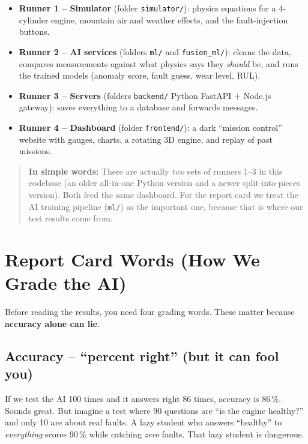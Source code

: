 \documentclass[11pt]{article}
\newenvironment{simplebox}
  {\par\medskip\noindent\begin{quote}\color{blue!55!black}\small
   \textbf{\textsf{In simple words:}}\space\space}
  {\end{quote}\medskip}
\newcommand{\code}[1]{\texttt{#1}}
\begin{document}
\begin{itemize}[nosep]
  \item \textbf{Runner 1 -- Simulator} (folder \code{simulator/}): physics
        equations for a 4-cylinder engine, mountain air and weather effects,
        and the fault-injection buttons.
  \item \textbf{Runner 2 -- AI services} (folders \code{ml/} and
        \code{fusion\_ml/}): cleans the data, compares measurements against
        what physics says they \emph{should} be, and runs the trained models
        (anomaly score, fault guess, wear level, RUL).
  \item \textbf{Runner 3 -- Servers} (folders \code{backend/} Python
        FastAPI + Node.js gateway): saves everything to a database and
        forwards messages.
  \item \textbf{Runner 4 -- Dashboard} (folder \code{frontend/}): a dark
        ``mission control'' website with gauges, charts, a rotating 3D
        engine, and replay of past missions.
\end{itemize}

\begin{simplebox}
There are actually \emph{two} sets of runners 1--3 in this codebase (an
older all-in-one Python version and a newer split-into-pieces version).
Both feed the same dashboard. For the report card we treat the AI training
pipeline (\code{ml/}) as the important one, because that is where our test
results come from.
\end{simplebox}

\section{Report Card Words (How We Grade the AI)}

Before reading the results, you need four grading words. These matter
because \textbf{accuracy alone can lie}.

\subsection*{Accuracy -- ``percent right'' (but it can fool you)}
If we test the AI 100 times and it answers right 86 times, accuracy is
86\,\%. Sounds great. But imagine a test where 90 questions are ``is the
engine healthy?'' and only 10 are about real faults. A lazy student who
answers ``healthy'' to \emph{everything} scores 90\,\% while catching
\emph{zero} faults. That lazy student is dangerous.
\end{document}
